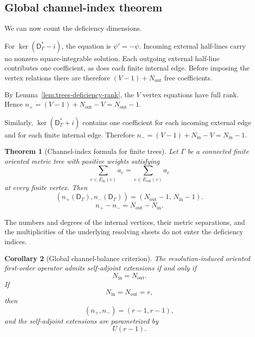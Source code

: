 \documentclass[11pt]{article}
\theoremstyle{plain}
\newtheorem{theorem}{Theorem}[section]
\newtheorem{corollary}[theorem]{Corollary}
\theoremstyle{definition}
\begin{document}
\subsection{Global channel-index theorem}
\label{subsec:trees-global-deficiency}
\label{subsec:trees-SA}

We can now count the deficiency dimensions.

For
\(\ker(\mathsf D_\Gamma^*-i)\),
the equation is
\(\psi'=-\psi\).
Incoming external half-lines carry no nonzero square-integrable solution.
Each outgoing external half-line contributes one coefficient, as does each
finite internal edge. Before imposing the vertex relations there are
therefore \((V-1)+N_{\mathrm{out}}\) free coefficients.

By Lemma~\ref{lem:trees-deficiency-rank}, the \(V\) vertex equations have
full rank. Hence
\(n_+ = (V-1)+N_{\mathrm{out}}-V = N_{\mathrm{out}}-1\).

Similarly, \(\ker(\mathsf D_\Gamma^*+i)\) contains one coefficient for each incoming external edge and for each
finite internal edge. Therefore
\(n_- = (V-1)+N_{\mathrm{in}}-V = N_{\mathrm{in}}-1\).

\begin{theorem}[Channel-index formula for finite trees]
\label{thm:trees-global-index}
Let \(\Gamma\) be a connected finite oriented metric tree with positive
weights satisfying
\[
  \sum_{e\in E_{\mathrm{in}}(v)}a_e
  =
  \sum_{e\in E_{\mathrm{out}}(v)}a_e
\]
at every finite vertex. Then
\[
  \left(
    n_+(\mathsf D_\Gamma),
    n_-(\mathsf D_\Gamma)
  \right)
  =
  \left(
    N_{\mathrm{out}}-1,\,
    N_{\mathrm{in}}-1
  \right).
\]
\[
  n_+-n_-
  =
  N_{\mathrm{out}}
  -
  N_{\mathrm{in}}.
\]
\end{theorem}

The numbers and degrees of the internal vertices, their metric separations,
and the multiplicities of the underlying resolving sheets do not enter the
deficiency indices.

\begin{corollary}[Global channel-balance criterion]
\label{cor:trees-SA}
The resolution-induced oriented first-order operator admits self-adjoint extensions
if and only if
\[
  N_{\mathrm{in}}
  =
  N_{\mathrm{out}}.
\]
If
\[
  N_{\mathrm{in}}
  =
  N_{\mathrm{out}}
  =
  r,
\]
then
\[
  (n_+,n_-)
  =
  (r-1,r-1),
\]
and the self-adjoint extensions are parametrized by
\[
  U(r-1).
\]
\end{corollary}
\end{document}
